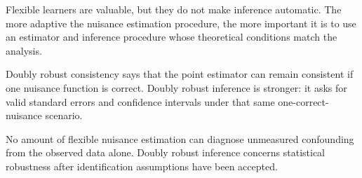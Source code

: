Flexible learners are valuable, but they do not make inference automatic. The more
adaptive the nuisance estimation procedure, the more important it is to use an
estimator and inference procedure whose theoretical conditions match the analysis.

\begin{keyidea}
Doubly robust consistency says that the point estimator can remain consistent if one
nuisance function is correct. Doubly robust inference is stronger: it asks for valid
standard errors and confidence intervals under that same one-correct-nuisance
scenario.
\end{keyidea}

\begin{assumptionbox}
No amount of flexible nuisance estimation can diagnose unmeasured confounding from
the observed data alone. Doubly robust inference concerns statistical robustness after
identification assumptions have been accepted.
\end{assumptionbox}
